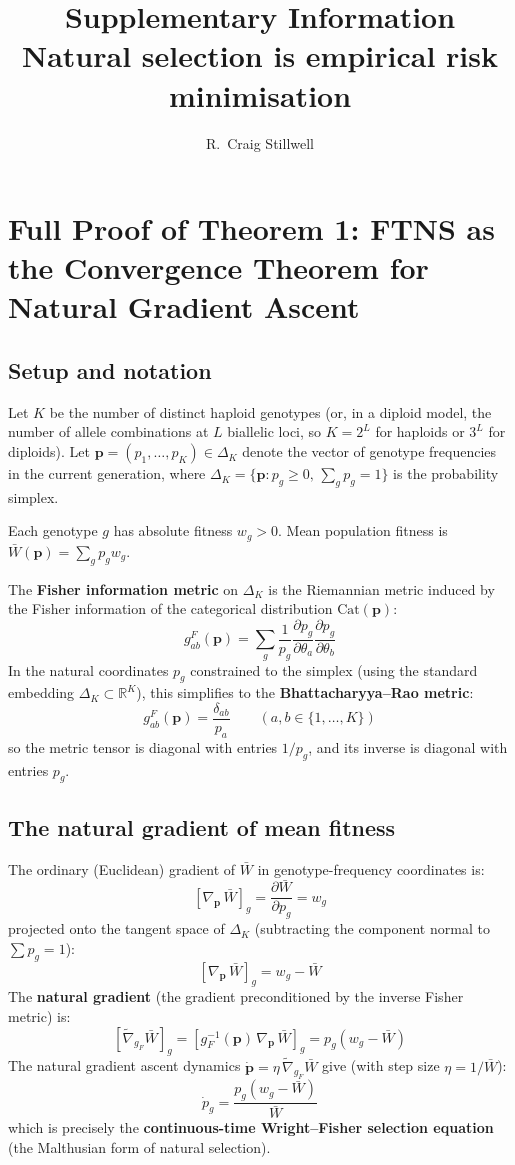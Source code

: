 \documentclass[12pt]{article}
\title{\textbf{Supplementary Information}\\[0.5em]
\large Natural selection is empirical risk minimisation}
\author{R.\ Craig Stillwell}
\date{}
\theoremstyle{remark}
\begin{document}
\maketitle
\tableofcontents
\clearpage

\section{Full Proof of Theorem 1: FTNS as the Convergence Theorem for Natural Gradient Ascent}

\subsection{Setup and notation}

Let $K$ be the number of distinct haploid genotypes (or, in a diploid model, the number of allele combinations at $L$ biallelic loci, so $K = 2^L$ for haploids or $3^L$ for diploids). Let $\mathbf{p} = (p_1, \ldots, p_K) \in \Delta_K$ denote the vector of genotype frequencies in the current generation, where $\Delta_K = \{\mathbf{p} : p_g \geq 0,\, \sum_g p_g = 1\}$ is the probability simplex.

Each genotype $g$ has absolute fitness $w_g > 0$. Mean population fitness is $\bar{W}(\mathbf{p}) = \sum_g p_g w_g$.

The \textbf{Fisher information metric} on $\Delta_K$ is the Riemannian metric induced by the Fisher information of the categorical distribution $\mathrm{Cat}(\mathbf{p})$:
\[
  g^F_{ab}(\mathbf{p}) = \sum_g \frac{1}{p_g} \frac{\partial p_g}{\partial \theta_a} \frac{\partial p_g}{\partial \theta_b}
\]
In the natural coordinates $p_g$ constrained to the simplex (using the standard embedding $\Delta_K \subset \mathbb{R}^K$), this simplifies to the \textbf{Bhattacharyya--Rao metric}:
\[
  g^F_{ab}(\mathbf{p}) = \frac{\delta_{ab}}{p_a} \qquad (a, b \in \{1, \ldots, K\})
\]
so the metric tensor is diagonal with entries $1/p_g$, and its inverse is diagonal with entries $p_g$.

\subsection{The natural gradient of mean fitness}

The ordinary (Euclidean) gradient of $\bar{W}$ in genotype-frequency coordinates is:
\[
  [\nabla_\mathbf{p}\,\bar{W}]_g = \frac{\partial \bar{W}}{\partial p_g} = w_g
\]
projected onto the tangent space of $\Delta_K$ (subtracting the component normal to $\sum p_g = 1$):
\[
  [\nabla_\mathbf{p}\,\bar{W}]_g = w_g - \bar{W}
\]
The \textbf{natural gradient} (the gradient preconditioned by the inverse Fisher metric) is:
\[
  [\tilde{\nabla}_{g_F} \bar{W}]_g = \left[g_F^{-1}(\mathbf{p})\,\nabla_\mathbf{p}\,\bar{W}\right]_g = p_g(w_g - \bar{W})
\]
The natural gradient ascent dynamics $\dot{\mathbf{p}} = \eta\,\tilde{\nabla}_{g_F}\bar{W}$ give (with step size $\eta = 1/\bar{W}$):
\[
  \dot{p}_g = \frac{p_g(w_g - \bar{W})}{\bar{W}}
\]
which is precisely the \textbf{continuous-time Wright--Fisher selection equation} (the Malthusian form of natural selection).
\end{document}

